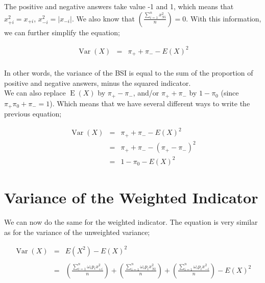 \documentclass[12pt,a4paper,oneside]{book}
\DeclareMathOperator{\Var}{Var}
\DeclareMathOperator{\E}{E}
\begin{document}
The positive and negative answers take value -1 and 1, which means that $x_{+i}^2 = x_{+i}$, $x_{-i}^2 = |x_{-i}|$. We also know that $\left( \frac{\sum_{i=1}^n x_{Ni}^2}{n} \right) = 0$. 
With this information, we can further simplify the equation;

\begin{eqnarray}
\Var(X) &=& \pi_+ + \pi_- - E ( X )^2 \label{var1} \\ \nonumber
\end{eqnarray}

In other words, the variance of the BSI is equal to the sum of the proportion of positive and negative answers, minus the squared indicator. \\
We can also replace $\E(X)$  by $\pi_+ - \pi_-$, and/or $\pi_+ + \pi_-$ by $ 1 - \pi_0$ (since $\pi_+ \pi_0 + \pi_- = 1$).
Which means that we have several different ways to write the previous equation;

\begin{eqnarray}
\Var(X) &=& \pi_+ + \pi_- - E ( X )^2  \nonumber \\
        &=& \pi_+ + \pi_- - ( \pi_+ - \pi_- )^2 \label{var2} \\
	    &=& 1 - \pi_0 - E(X)^2 \label{var3}
\end{eqnarray}




\section{Variance of the Weighted Indicator}

We can now do the same for the weighted indicator. The equation is very similar as for the variance of the unweighted variance;


\begin{eqnarray}
\Var(X) &=&  E\left( X^2\right) - E\left( X\right)^2 \nonumber \\ \nonumber \\
    &=& \left( \frac{\sum_{i=1}^n \omega_i p_i x_{+i}^2}{n} \right) + \left( \frac{\sum_{i=1}^n \omega_i p_i x_{Ni}^2}{n} \right) + \left( \frac{\sum_{i=1}^n \omega_i p_i x_{-i}^2}{n} \right) - E(X)^2 \nonumber \\
\end{eqnarray}
\end{document}
